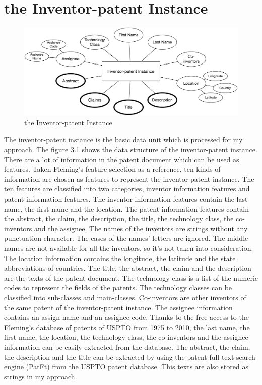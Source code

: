 \section{the Inventor-patent Instance}
\begin{figure}
\centering
\includegraphics[width=\headwidth]{Patent-inventorUnit.pdf}
\caption{the Inventor-patent Instance}
\end{figure}
The inventor-patent instance is the basic data unit which is processed for my approach. The figure 3.1 shows the data structure of the inventor-patent instance. There are a lot of information in the patent document which can be used as features. Taken Fleming's feature selection \cite{RePEc:eee:respol:v:43:y:2014:i:6:p:941-955} as a reference, ten kinds of information are chosen as features to represent the inventor-patent instance. The ten features are classified into two categories, inventor information features and patent information features. The inventor information  features contain the last name, the first name and the location. The patent information features contain the abstract, the claim, the description, the title, the technology class, the co-inventors and the assignee. The names of the inventors are strings without any punctuation character. The cases of the names' letters are ignored. The middle names are not available for all the inventors, so it's not taken into consideration. The location information contains the longitude, the latitude and the state abbreviations of countries. The title, the abstract, the claim and the description are the texts of the patent document. The technology class is a list of the numeric codes to represent the fields of the patents. The technology classes can be classified into sub-classes and main-classes. Co-inventors are other inventors of the same patent of the inventor-patent instance. The assignee information contains an assign name and an assignee code. Thanks to the free access to the Fleming's database of patents of USPTO from 1975 to 2010, the last name, the first name, the location, the technology class, the co-inventors and the assignee information can be easily extracted from the database. The abstract, the claim, the description and  the title can be extracted by using the patent full-text search engine (PatFt) from the USPTO patent database. This texts are also stored as strings in my approach.

